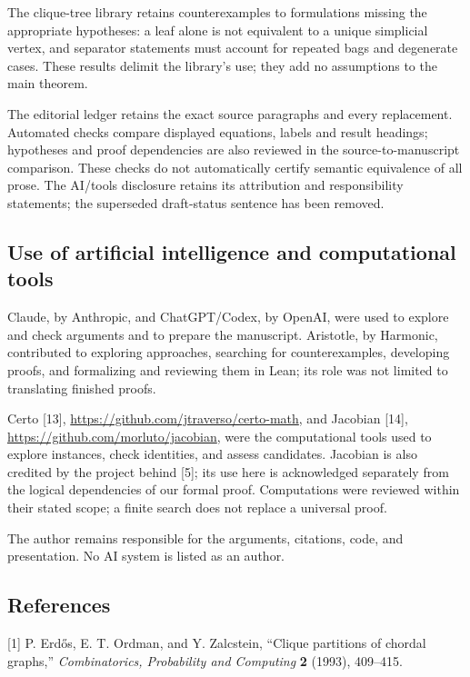 \documentclass[english,11pt,a4paper]{article}
\begin{document}
The clique-tree library retains counterexamples to formulations missing
the appropriate hypotheses: a leaf alone is not equivalent to a unique
simplicial vertex, and separator statements must account for repeated
bags and degenerate cases. These results delimit the library's use; they
add no assumptions to the main theorem.

The editorial ledger retains the exact source paragraphs and every
replacement. Automated checks compare displayed equations, labels and
result headings; hypotheses and proof dependencies are also reviewed in
the source-to-manuscript comparison. These checks do not automatically
certify semantic equivalence of all prose. The AI/tools disclosure
retains its attribution and responsibility statements; the superseded
draft-status sentence has been removed.

\subsection{Use of artificial intelligence and computational
tools}\label{use-of-artificial-intelligence-and-computational-tools}

Claude, by Anthropic, and ChatGPT/Codex, by OpenAI, were used to explore
and check arguments and to prepare the manuscript. Aristotle, by
Harmonic, contributed to exploring approaches, searching for
counterexamples, developing proofs, and formalizing and reviewing them
in Lean; its role was not limited to translating finished proofs.

Certo {[}13{]}, \url{https://github.com/jtraverso/certo-math}, and
Jacobian {[}14{]}, \url{https://github.com/morluto/jacobian}, were the
computational tools used to explore instances, check identities, and
assess candidates. Jacobian is also credited by the project behind
{[}5{]}; its use here is acknowledged separately from the logical
dependencies of our formal proof. Computations were reviewed within
their stated scope; a finite search does not replace a universal proof.

The author remains responsible for the arguments, citations, code, and
presentation. No AI system is listed as an author.

\subsection{References}\label{references}

{[}1{]} P. Erdős, E. T. Ordman, and Y. Zalcstein, ``Clique partitions of
chordal graphs,'' \emph{Combinatorics, Probability and Computing}
\textbf{2} (1993), 409--415.
\end{document}
